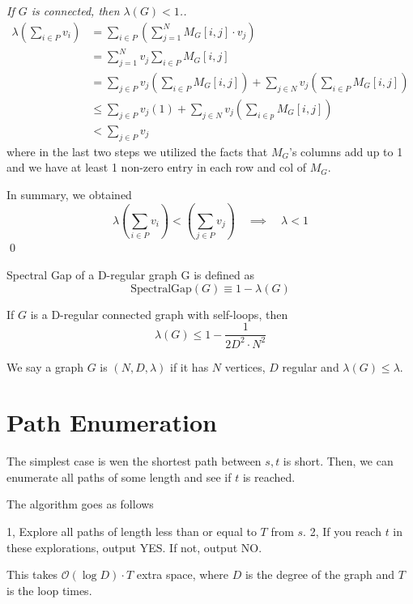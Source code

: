 \begin{proof} [If $G$ is connected, then $\lambda(G) < 1$.]
\begin{align}
	\lambda \left( \sum_{i \in P} v_i \right) 
	&= \sum_{i \in P} \left( \sum_{j = 1}^N M_G[i, j] \cdot v_j \right) \\
	&= \sum_{j = 1}^N v_j \sum_{i \in P} M_G[i, j] \\
	&= \sum_{j \in P} v_j \left( \sum_{i \in P} M_G[i, j] \right) + \sum_{j \in N} v_j \left( \sum_{i \in P} M_G[i, j] \right) \\
	&\leq \sum_{j \in P} v_j (1) + \sum_{j \in N} v_j \left( \sum_{i \in p} M_G[i, j] \right) \\
	&< \sum_{j \in P} v_j
\end{align}
where in the last two steps we utilized the facts that $M_G$'s columns add up to 1 and we have at least 1 non-zero entry in each row and col of $M_G$. 

In summary, we obtained
\begin{equation}
	\lambda \left( \sum_{i \in P} v_i \right) < \left( \sum_{j \in P} v_j \right) \quad \implies \quad \lambda < 1
\end{equation}
\qed

\end{proof}

\begin{definition}
	Spectral Gap of a D-regular graph G is defined as 
	\begin{equation}
		\text{SpectralGap} (G) 
		\equiv 1 - \lambda(G)
	\end{equation}
\end{definition}

\begin{lemma}
	If $G$ is a D-regular connected graph with self-loops, then
	\begin{equation}
		\lambda (G) \leq 1 - \frac{1}{2D^2 \cdot N^2}
	\end{equation}
\end{lemma}

\begin{definition}
	We say a graph $G$ is $(N, D, \lambda)$ if it has $N$ vertices, $D$ regular and $\lambda(G) \leq \lambda$. 
\end{definition}


\section{Path Enumeration}
The simplest case is wen the shortest path between $s, t$ is short. Then, we can enumerate all paths of some length and see if $t$ is reached. 

The algorithm goes as follows
\begin{algorithm}
	1, Explore all paths of length less than or equal to $T$ from $s$. 2, If you reach $t$ in these explorations, output YES. If not, output NO. 
\end{algorithm}
This takes $\mathcal O (\log D) \cdot T$ extra space, where $D$ is the degree of the graph and $T$ is the loop times. 

